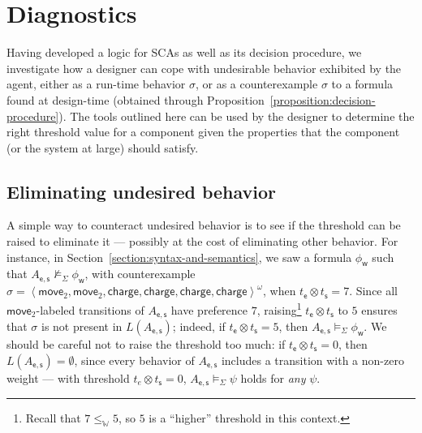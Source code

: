 \documentclass[a4paper]{article}
\newcommand{\angl}[1]{\left\langle#1\right\rangle}
\newcommand{\wcsemiring}{\mathbb{W}}
\newcommand{\composable}{\mathop{\ocircle}\nolimits}
\newtheorem{proposition}{Proposition}
\theoremstyle{definition}
\newcommand{\move}{\mathsf{move}}
\newcommand{\s}{\mathsf{s}}
\newcommand{\charge}{\mathsf{charge}}
\newcommand{\e}{\mathsf{e}}
\newcommand{\w}{\mathsf{w}}
\newcommand{\captures}{\mathop{\Yright}}
\begin{document}

\section{Diagnostics}%
\label{section:diagnostics}

Having developed a logic for SCAs as well as its decision procedure, we investigate how a designer can cope with undesirable behavior exhibited by the agent, either as a run-time behavior $\sigma$, or as a counterexample $\sigma$ to a formula found at design-time (obtained through Proposition~\ref{proposition:decision-procedure}). The tools outlined here can be used by the designer to determine the right threshold value for a component given the properties that the component (or the system at large) should satisfy.

\subsection{Eliminating undesired behavior}
A simple way to counteract undesired behavior is to see if the threshold can be raised to eliminate it --- possibly at the cost of eliminating other behavior. For instance, in Section~\ref{section:syntax-and-semantics}, we saw a formula $\phi_\w$ such that $A_{\e, \s} \not\models_\Sigma \phi_\w$, with counterexample $\sigma = \angl{\move_2, \move_2, \charge, \charge, \charge, \charge}^\omega$, when $t_\e \otimes t_\s = 7$. Since all $\move_2$-labeled transitions of $A_{\e, \s}$ have preference $7$, raising\footnote{Recall that $7 \leq_{\wcsemiring} 5$, so $5$ is a ``higher'' threshold in this context.} $t_\e \otimes t_\s$ to $5$ ensures that $\sigma$ is not present in $L(A_{\e, \s})$; indeed, if $t_\e \otimes t_\s = 5$, then $A_{\e, \s} \models_\Sigma \phi_\w$. We should be careful not to raise the threshold too much: if $t_\e \otimes t_\s = 0$, then $L(A_{\e, \s}) = \emptyset$, since every behavior of $A_{\e, \s}$ includes a transition with a non-zero weight --- with threshold $t_e \otimes t_\s = 0$, $A_{\e, \s} \models_\Sigma \psi$ holds for \emph{any} $\psi$.
\end{document}
